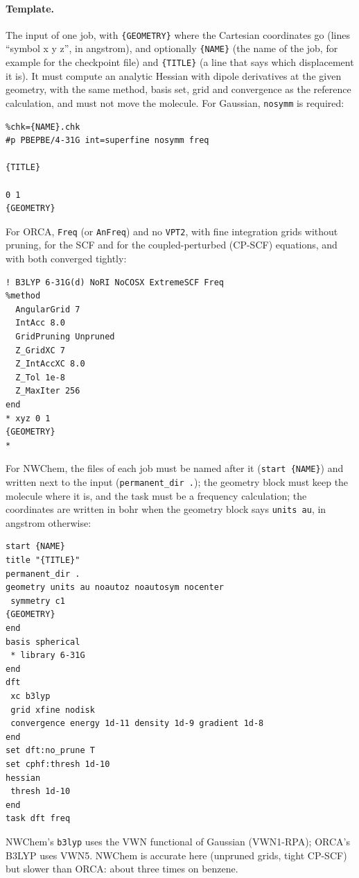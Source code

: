 \paragraph{Template.} The input of one job, with \texttt{\{GEOMETRY\}}
where the Cartesian coordinates go (lines ``symbol x y z'', in
angstrom), and optionally \texttt{\{NAME\}} (the name of the job,
for example for the checkpoint file) and \texttt{\{TITLE\}} (a line that
says which displacement it is). It must compute an analytic Hessian with
dipole derivatives at the given geometry, with the same method, basis
set, grid and convergence as the reference calculation, and must not
move the molecule. For Gaussian, \texttt{nosymm} is required:
\begin{lstlisting}
%chk={NAME}.chk
#p PBEPBE/4-31G int=superfine nosymm freq

{TITLE}

0 1
{GEOMETRY}

\end{lstlisting}
For ORCA, \texttt{Freq} (or \texttt{AnFreq}) and no \texttt{VPT2}, with
fine integration grids without pruning, for the SCF and for the
coupled-perturbed (CP-SCF) equations, and with both converged tightly:
\begin{lstlisting}
! B3LYP 6-31G(d) NoRI NoCOSX ExtremeSCF Freq
%method
  AngularGrid 7
  IntAcc 8.0
  GridPruning Unpruned
  Z_GridXC 7
  Z_IntAccXC 8.0
  Z_Tol 1e-8
  Z_MaxIter 256
end
* xyz 0 1
{GEOMETRY}
*
\end{lstlisting}
For NWChem, the files of each job must be named after it
(\texttt{start \{NAME\}}) and written next to the input
(\texttt{permanent\_dir .}); the geometry block must keep the molecule
where it is, and the task must be a frequency calculation; the
coordinates are written in bohr when the geometry block says
\texttt{units au}, in angstrom otherwise:
\begin{lstlisting}
start {NAME}
title "{TITLE}"
permanent_dir .
geometry units au noautoz noautosym nocenter
 symmetry c1
{GEOMETRY}
end
basis spherical
 * library 6-31G
end
dft
 xc b3lyp
 grid xfine nodisk
 convergence energy 1d-11 density 1d-9 gradient 1d-8
end
set dft:no_prune T
set cphf:thresh 1d-10
hessian
 thresh 1d-10
end
task dft freq
\end{lstlisting}
NWChem's \texttt{b3lyp} uses the VWN functional of Gaussian (VWN1-RPA);
ORCA's B3LYP uses VWN5. NWChem is accurate here (unpruned grids, tight
CP-SCF) but slower than ORCA: about three times on benzene.


